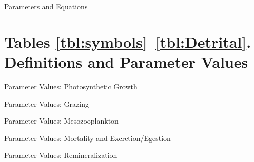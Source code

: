 \documentclass{article}
\begin{document}
Parameters and Equations

\section*{Tables \ref{tbl:symbols}--\ref{tbl:Detrital}. Definitions and Parameter Values}

\begin{table}[!ht]
  \caption{Parameter Values: Photosynthetic Growth} %
  \label{tbl:paramsPhoto}
  \begin{spacing}{0.4}
   
  \end{spacing}
\end{table}

\begin{table}[!ht]
  \caption{Parameter Values: Grazing}
  \label{tbl:paramsGrazing}
  \begin{spacing}{0.3}
   
  \end{spacing}
\end{table}

\begin{table}[!ht]
  \caption{Parameter Values: Mesozooplankton}
  \label{tbl:Mesozo}
  \begin{spacing}{0.4}
   
  \end{spacing}
\end{table}

\begin{table}[!ht]
  \caption{Parameter Values: Mortality and Excretion/Egestion}
  \label{tbl:Mort}
  \begin{spacing}{0.4}
   
  \end{spacing}
\end{table}

\begin{table}[!ht]
  \caption{Parameter Values: Remineralization}
  \label{tbl:Remin}
  \begin{spacing}{0.4}
   
  \end{spacing}
\end{table}
\end{document}
